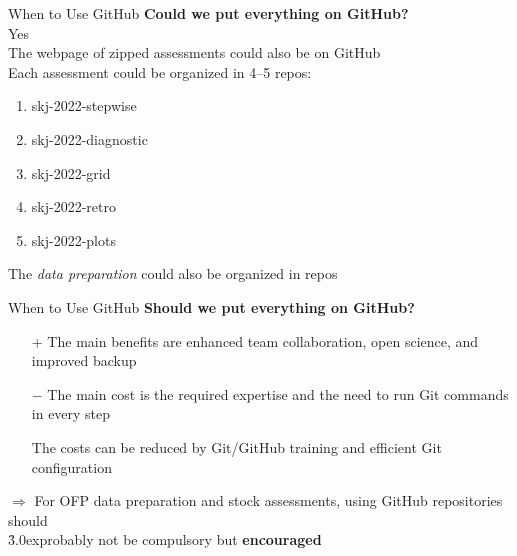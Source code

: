 \documentclass[aspectratio=169]{beamer}
\begin{document}

\begin{frame}[plain]
\end{frame}


\begin{frame}{When to Use GitHub}\small
  {\bf\darkgreen Could we put everything on GitHub?}
  \\[1ex]
  Yes\\[1ex]
  The webpage of zipped assessments could also be on GitHub\\[1ex]
  Each assessment could be organized in 4--5 repos:\\
  \begin{enumerate}\fns
    \item skj-2022-stepwise
    \item skj-2022-diagnostic
    \item skj-2022-grid
    \item skj-2022-retro
    \item skj-2022-plots
  \end{enumerate}
  \vspace{1ex}
  The {\orange\it data preparation} could also be organized in repos\\[1ex]
\end{frame}


\begin{frame}{When to Use GitHub}\small
  {\bf\darkgreen Should we put everything on GitHub?}
  \\[1ex]
  \begin{itemize}
    \item[+] The main {\green benefits} are enhanced team collaboration, open
    science, and improved backup\\[1.5ex]
    \item[$-$] The main {\orange cost} is the required expertise and the need to
    run Git commands in every step\\[1.5ex]
    \item[] The costs can be reduced by Git/GitHub training and efficient Git
    configuration
  \end{itemize}
  \vspace{3ex}
  $\Rightarrow$ For OFP {\green data preparation} and {\green stock
    assessments}, using GitHub repositories should\\[0.8ex]
  \h{3.0ex}probably not be compulsory but {\darkgreen\bf encouraged}
\end{frame}
\end{document}
